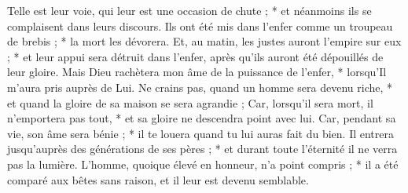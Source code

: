  Telle est leur voie, qui leur est une occasion de chute ; * et néanmoins ils se complaisent dans leurs discours.
\versseparator
 Ils ont été mis dans l'enfer comme un troupeau de brebis ; * la mort les dévorera.
\versseparator
 Et, au matin, les justes auront l'empire sur eux ; * et leur appui sera détruit dans l'enfer, après qu'ils auront été dépouillés de leur gloire.
\versseparator
 Mais Dieu rachètera mon âme de la puissance de l'enfer, * lorsqu'Il m'aura pris auprès de Lui.
\versseparator
 Ne crains pas, quand un homme sera devenu riche, * et quand la gloire de sa maison se sera agrandie ;
\versseparator
 Car, lorsqu'il sera mort, il n'emportera pas tout, * et sa gloire ne descendra point avec lui.
\versseparator
 Car, pendant sa vie, son âme sera bénie ; * il te louera quand tu lui auras fait du bien.
\versseparator
 Il entrera jusqu'auprès des générations de ses pères ; * et durant toute l'éternité il ne verra pas la lumière.
\versseparator
 L'homme, quoique élevé en honneur, n'a point compris ; * il a été comparé aux bêtes sans raison, et il leur est devenu semblable.